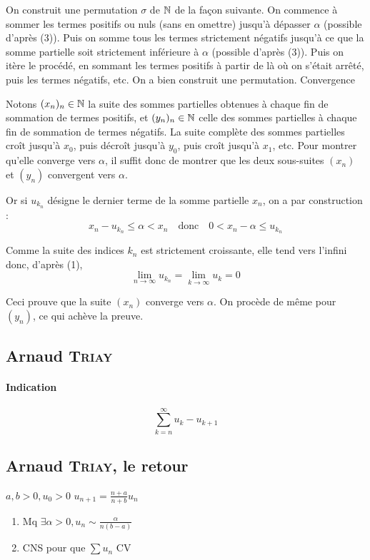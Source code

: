 On construit une permutation $\sigma$ de $\mathbb{N}$ de la façon suivante. On commence à sommer les termes positifs ou nuls (sans en omettre) jusqu'à dépasser $\alpha$ (possible d'après (3)). Puis on somme tous les termes strictement négatifs jusqu'à ce que la somme partielle soit strictement inférieure à $\alpha$ (possible d'après (3)). Puis on itère le procédé, en sommant les termes positifs à partir de là où on s'était arrêté, puis les termes négatifs, etc. On a bien construit une permutation.
Convergence

Notons $(x_n)_n\in \mathbb{N}$ la suite des sommes partielles obtenues à chaque fin de sommation de termes positifs, et $(y_n)_n\in \mathbb{N}$ celle des sommes partielles à chaque fin de sommation de termes négatifs. La suite complète des sommes partielles croît jusqu'à $x_0$, puis décroît jusqu'à $y_0$, puis croît jusqu'à $x_1$, etc. Pour montrer qu'elle converge vers $\alpha$, il suffit donc de montrer que les deux sous-suites $(x_n)$ et $(y_n)$ convergent vers $\alpha$.

Or si $u_{k_n}$ désigne le dernier terme de la somme partielle $x_n$, on a par construction :
\[
    x_n-u_{k_n}\leqslant\alpha<x_n\quad\text{donc}\quad0<x_n-\alpha\leqslant u_{k_n}
\]

Comme la suite des indices $k_n$ est strictement croissante, elle tend vers l'infini donc, d'après (1),
$$\lim_{n\to\infty}u_{k_n}=\lim_{k\to\infty}u_k=0$$

Ceci prouve que la suite $(x_n)$ converge vers $\alpha$. On procède de même pour $(y_n)$, ce qui achève la preuve.

\subsection{Arnaud \textsc{Triay}}

\paragraph{Indication}

\[
    \sum_{k=n}^{\infty} u_k - u_{k+1}
\]

\subsection{Arnaud \textsc{Triay}, le retour}

$a, b > 0, u_0 > 0$
$u_{n+1} = \frac{n+a}{n+b}u_n$
\begin{enumerate}
    \item Mq $\exists \alpha > 0, u_n \sim \frac{\alpha}{n(b-a)}$
    \item CNS pour que $\sum u_n$ CV
\end{enumerate}


